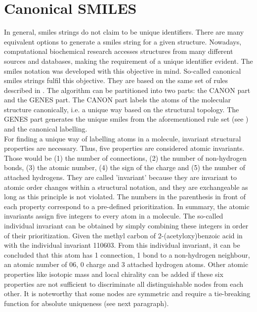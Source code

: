 \section{Canonical SMILES}\label{sec:cansmiles}
In general, \ac{smiles} strings do not claim to be unique identifiers. There are many equivalent options to generate a \ac{smiles} string for a given structure. Nowadays, computational biochemical research accesses structures from many different sources and databases, making the requirement of a unique identifier evident. The \ac{smiles} notation was developed with this objective in mind. So-called canonical \ac{smiles} strings fulfil this objective. They are based on the same set of rules described in . The algorithm can be partitioned into two parts: the CANON part and the GENES part. The CANON part labels the atoms of the molecular structure canonically, i.e. a unique way based on the structural topology. The GENES part generates the unique \ac{smiles} from the aforementioned rule set (see ) and the canonical labelling.\cite{Weininger1989}\\
For finding a unique way of labelling atoms in a molecule, invariant structural properties are necessary. Thus, five properties are considered atomic invariants. Those would be (1) the number of connections, (2) the number of non-hydrogen bonds, (3) the atomic number, (4) the sign of the charge and (5) the number of attached hydrogens. They are called 'invariant' because they are invariant to atomic order changes within a structural notation, and they are exchangeable as long as this principle is not violated. The numbers in the parenthesis in front of each property correspond to a pre-defined prioritization.
In summary, the atomic invariants assign five integers to every atom in a molecule. The so-called individual invariant can be obtained by simply combining these integers in order of their prioritization. Given the methyl carbon of 2-(acetyloxy)benzoic acid in  with the individual invariant 110603. From this individual invariant, it can be concluded that this atom has 1 connection, 1 bond to a non-hydrogen neighbour, an atomic number of 06, 0 charge and 3 attached hydrogen atoms.
Other atomic properties like isotopic mass and local chirality can be added if these six properties are not sufficient to discriminate all distinguishable nodes from each other. It is noteworthy that some nodes are symmetric and require a tie-breaking function for absolute uniqueness (see next paragraph).\cite{Weininger1989}\\
